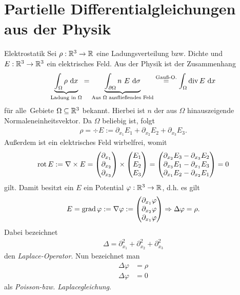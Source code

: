 \section{Partielle Differentialgleichungen aus der Physik}
\begin{genericdf}{Elektrostatik}
Sei $\rho  :  \mathbb{R}^3 \to \mathbb{R}$ eine Ladungsverteilung bzw. Dichte
und $E : \mathbb{R}^3 \to \mathbb{R}^3$ ein elektrisches Feld.
Aus der Physik ist der Zusammenhang
\begin{align*}
\underbrace{\int_\Omega \rho \ \text{\rmfamily d} x}_{\text{Ladung in $\Omega$}}
=
\underbrace{\int_{\partial\Omega} n \ E \ \text{\rmfamily d} \sigma}_{\text{Aus $\Omega$ ausfließendes Feld}}
\stackrel{\text{Gauß-O.}}{=}
\int_\Omega \operatorname{div} E \ \text{\rmfamily d} x
\end{align*}
für \glqq alle\grqq~Gebiete $\Omega \subseteq \mathbb{R}^3$ bekannt.
Hierbei ist $n$ der aus $\Omega$ hinauszeigende Normaleneinheitsvektor.
Da $\Omega$ beliebig ist, folgt
\begin{align*}
\rho = \div E 
:= \partial_{x_1} E_1 + \partial_{x_2} E_2 + \partial_{x_3} E_3.
\end{align*}
Außerdem ist ein elektrisches Feld wirbelfrei, womit
\begin{align*}
\operatorname{rot} E := \nabla \times E
=
\begin{pmatrix}
\partial_{x_1} \\
\partial_{x_2} \\
\partial_{x_3}
\end{pmatrix} 
\times
\begin{pmatrix}
E_1 \\ E_2 \\ E_3
\end{pmatrix}
= 
\begin{pmatrix}
\partial_{x_2} E_3 - \partial_{x_3} E_2\\
\partial_{x_3} E_1 - \partial_{x_1} E_3\\
\partial_{x_1} E_2 - \partial_{x_2} E_1
\end{pmatrix}
= 
0
\end{align*}
gilt. Damit besitzt ein $E$ ein Potential $\varphi : \mathbb{R}^3 \to \mathbb{R}$, d.h. es gilt
\begin{align*}
E = \operatorname{grad} \varphi := \nabla \varphi
:=
\begin{pmatrix}
\partial_{x_1} \varphi \\
\partial_{x_2} \varphi \\
\partial_{x_1} \varphi 
\end{pmatrix} 
\Rightarrow
\Delta \varphi = \rho.
\end{align*}
Dabei bezeichnet
\begin{align*}
\Delta = \partial_{x_1}^2 + \partial_{x_2}^2 + \partial_{x_3}^2
\end{align*}
den \textit{Laplace-Operator}.
Nun bezeichnet man
\begin{align*}
\Delta \varphi &= \rho\\
\Delta \varphi &= 0
\end{align*}
als \textit{Poisson-bzw. Laplacegleichung}.
\end{genericdf}

